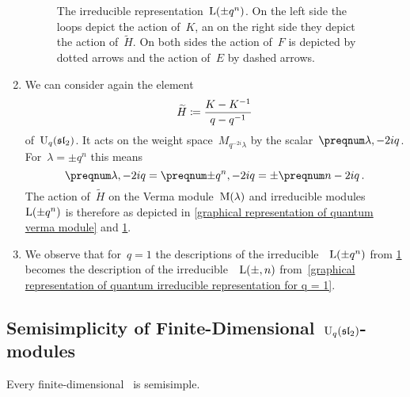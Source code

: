 \documentclass[a4paper, 11pt, oneside]{scrartcl}
\begin{document}
\begin{remark}
\begin{enumerate}
\begin{figure}
\begin{center}
        \end{center}
        \caption{
          The irreducible representation~$\operatorname{L}(\pm q^n)$.
          On the left side the loops depict the action of~$K$, an on the right side they depict the action of~$\widetilde{H}$.
          On both sides the action of~$F$ is depicted by dotted arrows and the action of~$E$ by dashed arrows.
        }
        \label{graphical representation of irreducible quantum representation}
      \end{figure}
    \item
      We can consider again the element
      \[
        \widetilde{H}
        \coloneqq
        \frac{K - K^{-1}}{q - q^{-1}}
      \]
      of~$\operatorname{U}_q(\mathfrak{sl}_2)$.
      It acts on the weight space~$M_{q^{-2i} \lambda}$ by the scalar~$\qnum{\lambda, -2i}$.
      For~$\lambda = \pm q^n$ this means
      \[
        \qnum{\lambda, -2i}
        =
        \qnum{\pm q^n, -2i}
        =
        \pm \qnum{n - 2i} \,.
      \]
      The action of~$\widetilde{H}$ on the Verma module~$\operatorname{M}(\lambda)$ and irreducible modules~$\operatorname{L}(\pm q^n)$ is therefore as depicted in \cref{graphical representation of quantum verma module} and \cref{graphical representation of irreducible quantum representation}.
    \item
      We observe that for~$q = 1$ the descriptions of the irreducible~~$\operatorname{L}(\pm q^n)$ from \cref{graphical representation of irreducible quantum representation} becomes the description of the irreducible~~$\operatorname{L}(\pm, n)$ from~\cref{graphical representation of quantum irreducible representation for q = 1}.
  \end{enumerate}
\end{remark}



\subsection{Semisimplicity of Finite-Dimensional~$\operatorname{U}_q(\mathfrak{sl}_2)$-modules}

\begin{theorem}
  \label{finite-dimensional quantum modules are semisimple}
  Every finite-dimensional~ is semisimple.
\end{theorem}
\end{document}
